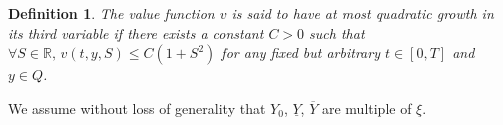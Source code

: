 \documentclass[8pt]{article}
\newtheorem{prop}{Proposition}
\newtheorem{definition}{Definition}
\begin{document}

\begin{definition}
The value function $v$ is said to have at most quadratic growth in its third variable if there exists a constant $C>0$ such that $\forall S \in \mathbb{R}, \, v(t,y,S) \leq C(1+S^2)$ for any fixed but arbitrary $t \in [0,T]$ and $y \in Q$.
\end{definition}

We assume without loss of generality that $Y_0$, $\underline Y$, $\overline{Y}$ are multiple of $\xi$.
\end{document}
